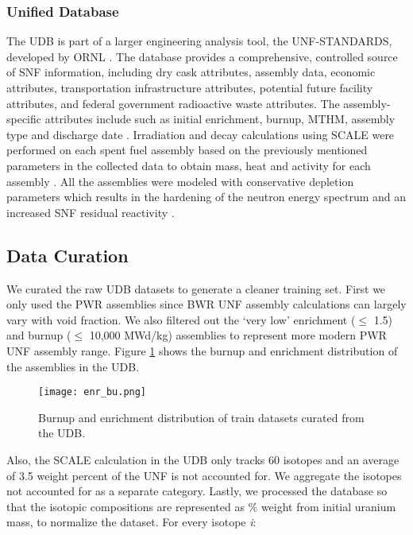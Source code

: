 \subsubsection{Unified Database}
The \gls{UDB} is part of a larger engineering
analysis tool, the \gls{UNF-STANDARDS}, developed
by \gls{ORNL} \cite{peterson_used_2013}.  
The database provides a comprehensive, controlled
source of \gls{SNF} information, including
dry cask attributes, assembly data, economic attributes,
transportation infrastructure attributes, potential future
facility attributes, and federal government radioactive
waste attributes. 
The assembly-specific attributes include 
such as initial enrichment, burnup, \gls{MTHM}, assembly 
type and discharge date \cite{peterson_fuel_2015}. 
Irradiation and decay calculations using SCALE 
\cite{bowman_scale_2011} were performed on each 
spent fuel assembly based on the previously mentioned 
parameters in the collected data to obtain mass, heat 
and activity for each assembly \cite{peterson_additional_2017}. 
All the assemblies were modeled with conservative 
depletion parameters which results in the hardening of 
the neutron energy spectrum and an increased \gls{SNF} 
residual reactivity \cite{peterson_additional_2017}. 

\subsection{Data Curation}

We curated the raw \gls{UDB} datasets to generate
a cleaner training set. First we only used the 
\gls{PWR} assemblies since \gls{BWR} \gls{UNF} assembly
calculations can largely vary with void fraction.
We also filtered out the
`very low' enrichment ($\leq$ 1.5) and
burnup ($\leq$ 10,000 MWd/kg)
assemblies to represent more modern \gls{PWR} \gls{UNF}
assembly range. Figure \ref{fig:enr_bu} shows the
burnup and enrichment distribution of the assemblies in the
\gls{UDB}.


\begin{figure}
    \centering
    \texttt{[image: enr\_bu.png]}
    \caption{Burnup and enrichment distribution of train
             datasets curated from the \gls{UDB}.}
    \label{fig:enr_bu}
\end{figure}


Also, the SCALE calculation in the \gls{UDB} only tracks 60 isotopes
and an average of 3.5 weight percent of the \gls{UNF} is not accounted for. We
aggregate the isotopes not accounted for as a separate category. Lastly,
we processed the database so that the isotopic compositions are 
represented as \% weight from initial uranium mass, to normalize
the dataset. For every isotope \textit{i}:

